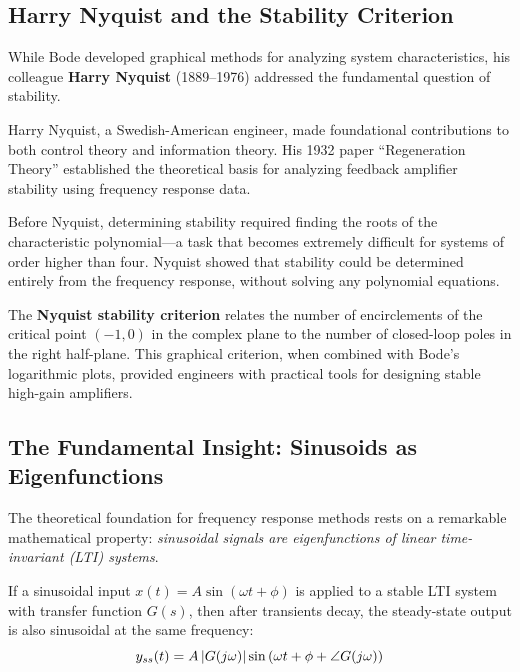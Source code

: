 \subsection{Harry Nyquist and the Stability Criterion}

While Bode developed graphical methods for analyzing system characteristics, his colleague \textbf{Harry Nyquist} (1889--1976) addressed the fundamental question of stability.

\begin{historicalbox}
Harry Nyquist, a Swedish-American engineer, made foundational contributions to both control theory and information theory. His 1932 paper ``Regeneration Theory'' established the theoretical basis for analyzing feedback amplifier stability using frequency response data.
\end{historicalbox}

Before Nyquist, determining stability required finding the roots of the characteristic polynomial---a task that becomes extremely difficult for systems of order higher than four. Nyquist showed that stability could be determined entirely from the frequency response, without solving any polynomial equations.

The \textbf{Nyquist stability criterion} relates the number of encirclements of the critical point $(-1, 0)$ in the complex plane to the number of closed-loop poles in the right half-plane. This graphical criterion, when combined with Bode's logarithmic plots, provided engineers with practical tools for designing stable high-gain amplifiers.

\subsection{The Fundamental Insight: Sinusoids as Eigenfunctions}

The theoretical foundation for frequency response methods rests on a remarkable mathematical property: \textit{sinusoidal signals are eigenfunctions of linear time-invariant (LTI) systems}.

\begin{theorem}
\label{thm:eigenfunction}
If a sinusoidal input $x(t) = A\sin(\omega t + \phi)$ is applied to a stable LTI system with transfer function $G(s)$, then after transients decay, the steady-state output is also sinusoidal at the same frequency:
\begin{equation}
y_{ss}(t) = A\left|G(j\omega)\right|\sin\left(\omega t + \phi + \angle G(j\omega)\right)
\label{eq:sinusoidal_ss}
\end{equation}
\end{theorem}

